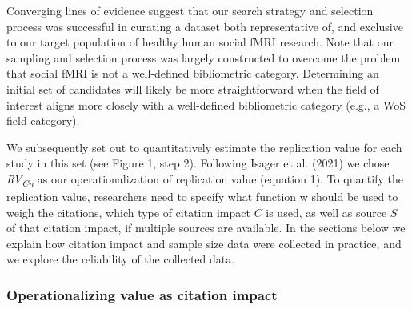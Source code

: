 \documentclass[
  man,floatsintext]{apa6}
\begin{document}
Converging lines of evidence suggest that our search strategy and selection process was successful in curating a dataset both representative of, and exclusive to our target population of healthy human social fMRI research. Note that our sampling and selection process was largely constructed to overcome the problem that social fMRI is not a well-defined bibliometric category. Determining an initial set of candidates will likely be more straightforward when the field of interest aligns more closely with a well-defined bibliometric category (e.g., a WoS field category).

We subsequently set out to quantitatively estimate the replication value for each study in this set (see Figure 1, step 2). Following Isager et al. (2021) we chose \emph{RV\textsubscript{Cn}} as our operationalization of replication value (equation 1). To quantify the replication value, researchers need to specify what function w should be used to weigh the citations, which type of citation impact \(C\) is used, as well as source \(S\) of that citation impact, if multiple sources are available. In the sections below we explain how citation impact and sample size data were collected in practice, and we explore the reliability of the collected data.

\hypertarget{operationalizing-value-as-citation-impact}{%
\subsubsection{Operationalizing value as citation impact}\label{operationalizing-value-as-citation-impact}}
\end{document}
